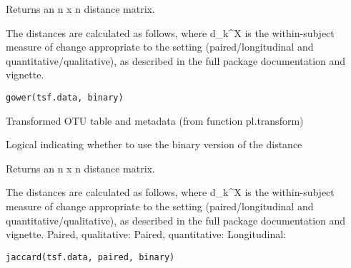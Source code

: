 \documentclass[a4paper]{book}
\begin{document}
%
\begin{Value}
Returns an n x n distance matrix.
\end{Value}
%
\begin{Description}\relax
The distances are calculated as follows, where d\_k\textasciicircum{}X is the within-subject 
measure of change appropriate to the setting (paired/longitudinal and 
quantitative/qualitative), as described in the full package documentation 
and vignette. 

\end{Description}
%
\begin{Usage}
\begin{verbatim}
gower(tsf.data, binary)
\end{verbatim}
\end{Usage}
%
\begin{Arguments}
\begin{ldescription}
\item[\code{tsf.data}] Transformed OTU table and metadata (from function pl.transform)

\item[\code{binary}] Logical indicating whether to use the binary version of the distance
\end{ldescription}
\end{Arguments}
%
\begin{Value}
Returns an n x n distance matrix.
\end{Value}
%
\begin{Description}\relax
The distances are calculated as follows, where d\_k\textasciicircum{}X is the within-subject 
measure of change appropriate to the setting (paired/longitudinal and 
quantitative/qualitative), as described in the full package documentation 
and vignette. 
Paired, qualitative: 
Paired, quantitative: 
Longitudinal: 
\end{Description}
%
\begin{Usage}
\begin{verbatim}
jaccard(tsf.data, paired, binary)
\end{verbatim}
\end{Usage}
\end{document}
